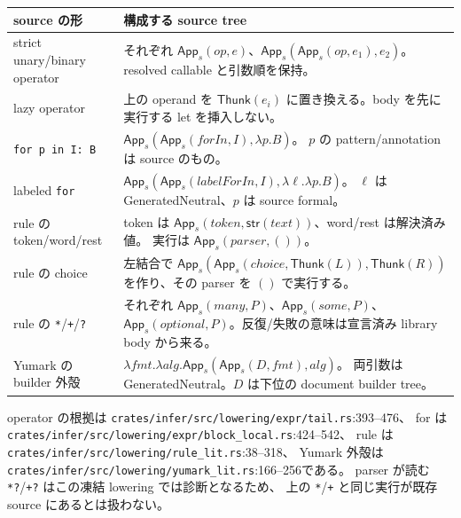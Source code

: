 \documentclass[11pt,a4paper]{article}
\begin{document}
\begin{longtable}{>{\raggedright\arraybackslash}p{}>{\raggedright\arraybackslash}p{}}
\toprule source の形 & 構成する source tree \\
\midrule\endhead
strict unary/binary operator &
それぞれ \(\mathsf{App}_s(op,e)\)、\(\mathsf{App}_s(\mathsf{App}_s(op,e_1),e_2)\)。
resolved callable と引数順を保持。\\
lazy operator &
上の operand を \(\mathsf{Thunk}(e_i)\) に置き換える。body を先に実行する let を挿入しない。\\
\texttt{for p in I: B} &
\(\mathsf{App}_s(\mathsf{App}_s(forIn,I),\lambda p.B)\)。
\(p\) の pattern/annotation は source のもの。\\
labeled \texttt{for} &
\(\mathsf{App}_s(\mathsf{App}_s(labelForIn,I),\lambda\ell.\lambda p.B)\)。
\(\ell\) は GeneratedNeutral、\(p\) は source formal。\\
rule の token/word/rest &
token は \(\mathsf{App}_s(token,\mathsf{str}(text))\)、word/rest は解決済み値。
実行は \(\mathsf{App}_s(parser,())\)。\\
rule の choice &
左結合で \(\mathsf{App}_s(\mathsf{App}_s(choice,\mathsf{Thunk}(L)),\mathsf{Thunk}(R))\)
を作り、その parser を \(()\) で実行する。\\
rule の \texttt{*}/\texttt{+}/\texttt{?} &
それぞれ \(\mathsf{App}_s(many,P)\)、\(\mathsf{App}_s(some,P)\)、
\(\mathsf{App}_s(optional,P)\)。反復/失敗の意味は宣言済み library body から来る。\\
Yumark の builder 外殻 &
\(\lambda fmt.\lambda alg.
 \mathsf{App}_s(\mathsf{App}_s(D,fmt),alg)\)。
両引数は GeneratedNeutral。\(D\) は下位の document builder tree。\\
\bottomrule
\end{longtable}

operator の根拠は \nolinkurl{crates/infer/src/lowering/expr/tail.rs}:393--476、
for は \nolinkurl{crates/infer/src/lowering/expr/block_local.rs}:424--542、
rule は \nolinkurl{crates/infer/src/lowering/rule_lit.rs}:38--318、
Yumark 外殻は \nolinkurl{crates/infer/src/lowering/yumark_lit.rs}:166--256である。
parser が読む \texttt{*?}/\texttt{+?} はこの凍結 lowering では診断となるため、
上の \texttt{*}/\texttt{+} と同じ実行が既存 source にあるとは扱わない。
\end{document}
